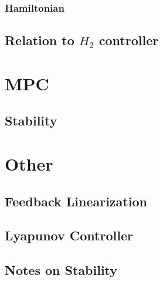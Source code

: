 \subsubsection{Hamiltonian}
\subsection{Relation to $H_2$ controller}
\section{MPC}
\subsection{Stability}
\section{Other}
\subsection{Feedback Linearization}
\subsection{Lyapunov Controller}
\subsection{Notes on Stability}